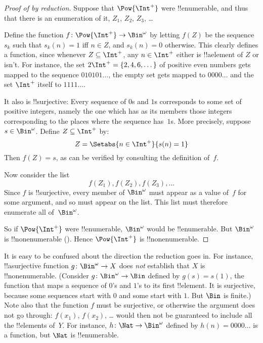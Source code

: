 \documentclass[../../../include/open-logic-section]{subfiles}
\begin{document}
\begin{proof}[Proof of {} by reduction]
Suppose that $\Pow{\Int^+}$ were !!{enumerable}, and thus that
there is an enumeration of it, $Z_{1}$, $Z_{2}$, $Z_{3}$, \dots

Define the function $f \colon \Pow{\Int^+} \to \Bin^\omega$ by letting
$f(Z)$ be the sequence $s_{k}$ such that $s_{k}(n) = 1$ iff $n \in Z$,
and $s_k(n) = 0$ otherwise.  This clearly defines a function, since
whenever $Z \subseteq \Int^+$, any $n \in \Int^+$ either is
!!a{element} of $Z$ or isn't.  For instance, the set $2\Int^+ = \{2,
4, 6, \dots\}$ of positive even numbers gets mapped to the sequence
$010101\dots$, the empty set gets mapped to $0000\dots$ and the set
$\Int^+$ itself to $1111\dots$.

It also is !!{surjective}: Every sequence of $0$s and $1$s corresponds
to some set of positive integers, namely the one which has as its
members those integers corresponding to the places where the sequence
has~$1$s. More precisely, suppose $s \in \Bin^\omega$.  Define $Z
\subseteq \Int^+$ by:
\[
Z = \Setabs{n \in \Int^+}{s(n) = 1}
\]
Then $f(Z) = s$, as can be verified by consulting the definition
of~$f$.

Now consider the list
\[
f(Z_1), f(Z_2), f(Z_3), \dots
\]
Since $f$ is !!{surjective}, every member of $\Bin^\omega$ must
appear as a value of~$f$ for some argument, and so must appear on the
list. This list must therefore enumerate all of~$\Bin^\omega$.

So if $\Pow{\Int^+}$ were !!{enumerable}, $\Bin^\omega$ would be
!!{enumerable}.  But $\Bin^\omega$ is !!{nonenumerable}
(). Hence $\Pow{\Int^+}$ is
!!{nonenumerable}.
\end{proof}

\begin{explain}
It is easy to be confused about the direction the reduction goes in.
For instance, !!a{surjective} function $g \colon \Bin^\omega \to X$
does \emph{not} establish that $X$ is !!{nonenumerable}.  (Consider $g
\colon \Bin^\omega \to \Bin$ defined by $g(s) = s(1)$, the function
that maps a sequence of $0$'s and $1$'s to its first !!{element}.  It
is surjective, because some sequences start with $0$ and some start
with $1$. But $\Bin$ is finite.)  Note also that the function $f$ must
be surjective, or otherwise the argument does not go through:
$f(x_1)$, $f(x_2)$, \dots{} would then not be guaranteed to include
all the !!{element}s of~$Y$. For instance, $h\colon \Nat \to
\Bin^\omega$ defined by $h(n) = 0000\dots$ is a function, but $\Nat$
is !!{enumerable}.
\end{explain}
\end{document}
